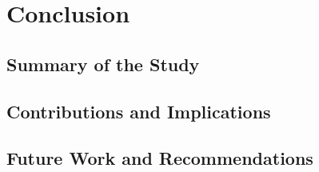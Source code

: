 \newpage\section{Conclusion}

\subsection{Summary of the Study}

\subsection{Contributions and Implications}

\subsection{Future Work and Recommendations}